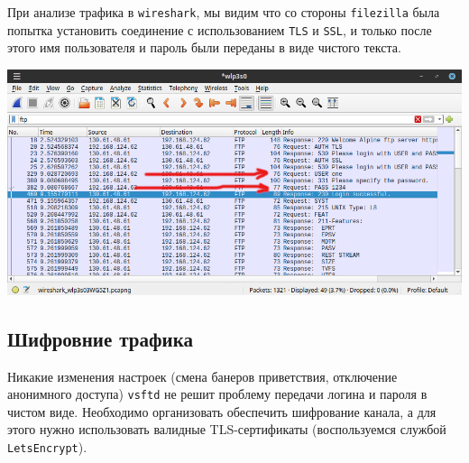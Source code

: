 \newpage

При анализе трафика в \texttt{wireshark}, мы видим что со стороны \texttt{filezilla} была попытка установить соединение с использованием \texttt{TLS} и \texttt{SSL}, и только после этого имя пользователя и пароль были переданы в виде чистого текста.
\begin{center}
    \includegraphics[scale=0.55]{res/5.wireshark-ftp-plain.png}
\end{center}

\subsection*{Шифровние трафика}

Никакие изменения настроек (смена банеров приветствия, отключение анонимного доступа) \texttt{vsftd} не решит проблему передачи логина и пароля в чистом виде. Необходимо организовать обеспечить шифрование канала, а для этого нужно использовать валидные TLS-сертификаты (воспользуемся службой \texttt{LetsEncrypt}).

